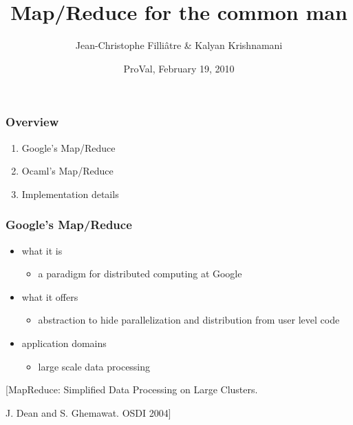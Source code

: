 \documentclass{beamer}
\begin{document}
\title{Map/Reduce for the common man}
\author[Jean-Christophe]{Jean-Christophe Filli\^atre \& Kalyan Krishnamani}
\institute{
}
\date{ProVal, February 19, 2010}

\begin{frame}
  \titlepage
  \hfill
  \hfill
  \hfill
\end{frame}

\begin{frame}\frametitle{Overview}
  \begin{enumerate}
  \item Google's Map/Reduce
  \item Ocaml's Map/Reduce
  \item Implementation details
  \end{enumerate}
\end{frame}

\begin{frame}\frametitle{Google's Map/Reduce}
  \begin{itemize}
  \item 
    what it is
    \begin{itemize}
    \item a paradigm for distributed computing at Google
    \end{itemize}

    \bigskip
  \item 
    what it offers
    \begin{itemize}
    \item abstraction to hide parallelization and distribution from
      user level code
    \end{itemize}

    \bigskip
  \item 
    application domains
    \begin{itemize}
    \item large scale data processing
    \end{itemize}
  \end{itemize}

  \vfill
  [MapReduce: Simplified Data Processing on Large Clusters. \par
  J. Dean and S. Ghemawat. OSDI 2004]
\end{frame}
\end{document}
